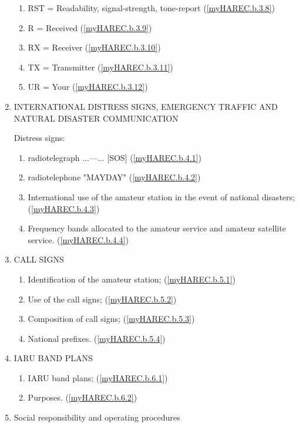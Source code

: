 \begin{enumerate}[noitemsep]
\begin{enumerate}
\item RST = Readability, signal-strength, tone-report (\ref{myHAREC.b.3.8})\label{HAREC.b.3.8}
\item R = Received (\ref{myHAREC.b.3.9})\label{HAREC.b.3.9}
\item RX = Receiver (\ref{myHAREC.b.3.10})\label{HAREC.b.3.10}
\item TX = Transmitter (\ref{myHAREC.b.3.11})\label{HAREC.b.3.11}
\item UR = Your (\ref{myHAREC.b.3.12})\label{HAREC.b.3.12}
\end{enumerate}
\item INTERNATIONAL DISTRESS SIGNS, EMERGENCY TRAFFIC AND NATURAL DISASTER COMMUNICATION

Distress signs:
\begin{enumerate}
\item radiotelegraph ...---... [SOS] (\ref{myHAREC.b.4.1})\label{HAREC.b.4.1}
\item radiotelephone "MAYDAY" (\ref{myHAREC.b.4.2})\label{HAREC.b.4.2}
\item International use of the amateur station in the event of national disasters; (\ref{myHAREC.b.4.3})\label{HAREC.b.4.3}
\item Frequency bands allocated to the amateur service and amateur satellite service. (\ref{myHAREC.b.4.4})\label{HAREC.b.4.4}
\end{enumerate}
\item CALL SIGNS
\begin{enumerate}
\item Identification of the amateur station; (\ref{myHAREC.b.5.1})\label{HAREC.b.5.1}
\item Use of the call signs; (\ref{myHAREC.b.5.2})\label{HAREC.b.5.2}
\item Composition of call signs; (\ref{myHAREC.b.5.3})\label{HAREC.b.5.3}
\item National prefixes. (\ref{myHAREC.b.5.4})\label{HAREC.b.5.4}
\end{enumerate}
\item IARU BAND PLANS
\begin{enumerate}
\item IARU band plans; (\ref{myHAREC.b.6.1})\label{HAREC.b.6.1}
\item Purposes. (\ref{myHAREC.b.6.2})\label{HAREC.b.6.2}
\end{enumerate}
\item Social responsibility and operating procedures
\begin{enumerate}

\end{enumerate}
\end{enumerate}
